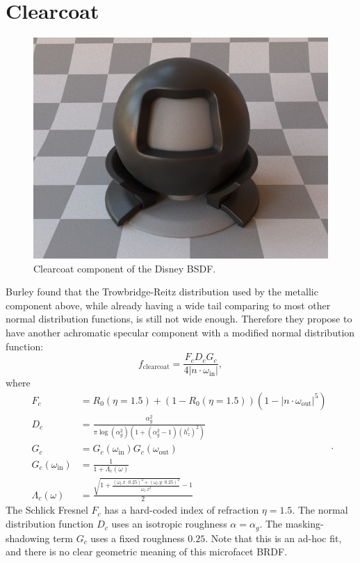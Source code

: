 \section{Clearcoat}
\begin{figure}
	\centering
	\includegraphics[width=0.5\linewidth]{imgs/disney_clearcoat.png}
	\caption{Clearcoat component of the Disney BSDF.}
\end{figure}

Burley found that the Trowbridge-Reitz distribution used by the metallic component above, while already having a wide tail comparing to most other normal distribution functions, is still not wide enough. Therefore they propose to have another achromatic specular component with a modified normal distribution function:
\begin{equation}
f_{\text{clearcoat}} = \frac{F_c D_c G_c}{4 |n \cdot \omega_{\text{in}}|},
\label{eq:f_clearcoat}
\end{equation}
where
\begin{equation}
\begin{aligned}
F_c &= R_0(\eta = 1.5) + (1 - R_0(\eta = 1.5)) (1 - |n \cdot \omega_{\text{out}}|^5) \\
D_c &= \frac{\alpha_g^2}{\pi \log(\alpha_g^2) \left( 1 + (\alpha_g^2 - 1) \left(h^l_z\right)^2 \right)} \\
G_c &= G_{c}(\omega_{\text{in}}) G_{c}(\omega_{\text{out}}) \\
G_{c}(\omega_{\text{in}}) &= \frac{1}{1 + \Lambda_c(\omega)} \\
\Lambda_c(\omega) &= \frac{\sqrt{1 + \frac{\left(\omega_l.x \cdot 0.25\right)^2 + \left(\omega_l.y \cdot 0.25\right)^2}{\omega_l.z^2}} - 1}{2}
\end{aligned}.
\end{equation}
The Schlick Fresnel $F_c$ has a hard-coded index of refraction $\eta = 1.5$. The normal distribution function $D_c$ uses an isotropic roughness $\alpha = \alpha_g$. The masking-shadowing term $G_c$ uses a fixed roughness $0.25$. Note that this is an ad-hoc fit, and there is no clear geometric meaning of this microfacet BRDF.

